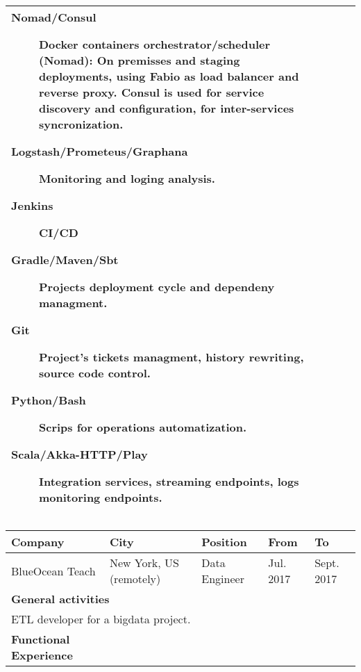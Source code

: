 \begin{cventries}
\begin{tabular}{|p{4.5cm} | p{2cm} | p{4cm} | p{2cm} | p{2cm}|}
{\begin{description}
                        \item[Nomad/Consul] Docker containers orchestrator/scheduler (Nomad): On premisses and staging deployments, using Fabio as load balancer and reverse proxy. Consul is used for service discovery and configuration, for inter-services syncronization.

                        \item[Logstash/Prometeus/Graphana] Monitoring and loging analysis.

                        \item[Jenkins] CI/CD

                        \item[Gradle/Maven/Sbt] Projects deployment cycle and dependeny managment.
                        \item[Git] Project's tickets managment, history rewriting, source code control.

                        \item[Python/Bash] Scrips for operations automatization.

                        \item[Scala/Akka-HTTP/Play] Integration services, streaming endpoints, logs monitoring endpoints.

                       \end{description}
      } \\
 

    \hline

  \end{tabular}



  \begin{tabular}{|p{4.5cm} | p{2cm} | p{4cm} | p{2cm} | p{2cm}|}
    \hline
    \textbf{Company} & 
    \textbf{City} & 
    \textbf{Position} & 
    \textbf{From} & \textbf{To} \\
     \hline
    BlueOcean Teach & 
    New York, US \hspace{1cm} (remotely) & 
    Data Engineer & 
    
    Jul. 2017 & Sept. 2017 \\ 
    \hline
    \multicolumn{5}{|l|}{\textbf{General activities}} \\

     \multicolumn{5}{|p{15cm}|}{
       ETL developer for a bigdata project.
       } \\
     \hline
    \textbf{Functional Experience} & \multicolumn{4}{p{12cm}|}{

}
\end{tabular}
\end{cventries}

